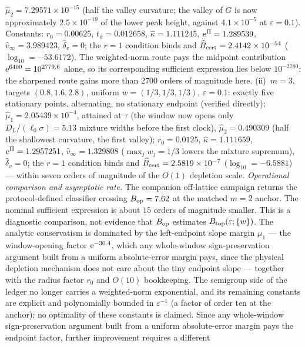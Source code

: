 \begin{remark}
\(\widehat\mu_2=7.29571\times10^{-15}\) (half the valley curvature; the valley of \(G\) is now
approximately \(2.5\times10^{-19}\) of the lower peak height, against
\(4.1\times10^{-5}\) at \(\varepsilon=0.1\)).  Constants: \(r_0=0.00625\),
\(t_\vartheta=0.012658\), \(\hat\kappa=1.111245\),
\(\mathrm e^{\Pi}=1.289539\), \(\widehat v_\infty=3.989423\),
\(\widehat\delta_v=0\); the
\(r=1\) condition binds and
\(\widehat B_{\rm cert}=2.4142\times10^{-54}\)
(\(\log_{10}=-53.6172\)).  The weighted-norm route pays
the midpoint contribution \(\mathrm e^{6400}=10^{2779.6}\) alone, so its
corresponding sufficient expression lies below
\(10^{-2780}\): the sharpened route gains more than \(2700\) orders of
magnitude here.  (ii)~\(m=3\), targets \((0.8,1.6,2.8)\), uniform
\(w=(1/3,1/3,1/3)\), \(\varepsilon=0.1\): exactly five stationary points,
alternating, no stationary endpoint (verified directly);
\(\widehat\mu_1=2.05439\times10^{-4}\), attained at \(\tau\) (the window now opens
only \(D_L/(\ell_0\sigma)=5.13\) mixture widths before the first clock),
\(\widehat\mu_2=0.490309\) (half the shallowest curvature, the first valley);
\(r_0=0.0125\), \(\hat\kappa=1.111659\), \(\mathrm e^{\Pi}=1.2957251\),
\(\widehat v_\infty=1.329808\)
(\(\max_jw_j=1/3\) lowers the mixture supremum),
\(\widehat\delta_v=0\); the \(r=1\) condition binds and
\(\widehat B_{\rm cert}=2.5819\times10^{-7}\)
(\(\log_{10}=-6.5881\)) ---
within seven orders of magnitude of the \(O(1)\) depletion scale.
\emph{Operational comparison and asymptotic rate.}  The companion
off-lattice campaign returns the protocol-defined classifier crossing
\(B_{\rm op}=7.62\) at the matched \(m=2\) anchor.  The nominal sufficient
expression is about \(15\) orders of magnitude smaller.  This is a diagnostic
comparison, not evidence that \(B_{\rm op}\) estimates
\(B_{\rm top}(\varepsilon;\{w\})\).  The analytic conservatism is dominated
by the left-endpoint slope
margin \(\mu_1\) --- the window-opening factor \(\mathrm e^{-30.4}\), which any
whole-window sign-preservation argument built from a uniform absolute-error
margin pays,
since the physical depletion mechanism does not care about the tiny
endpoint slope --- together with the radius factor \(r_0\) and \(O(10)\)
bookkeeping.  The semigroup side of the ledger no longer carries a
weighted-norm exponential, and its remaining constants are explicit and
polynomially bounded in \(\varepsilon^{-1}\) (a factor of order ten at the
anchor); no optimality of these constants is claimed.  Since any
whole-window sign-preservation argument built from a uniform absolute-error
margin pays the endpoint factor, further improvement requires a different

\end{remark}
